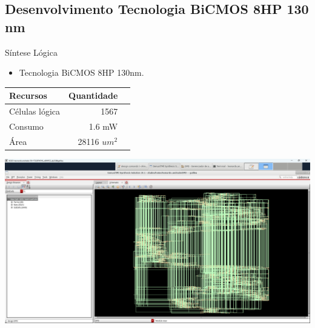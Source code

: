 \documentclass{if-beamer}
\begin{document}
\subsection{Desenvolvimento Tecnologia BiCMOS 8HP 130 nm}
\begin{frame}{Síntese Lógica}
		\begin{minipage}{0.5\textwidth}
		\begin{itemize}
			\item Tecnologia BiCMOS 8HP 130nm.
		\end{itemize}
		\begin{tabular}{|l|r|r|}
			\hline
			Recursos & Quantidade  \\
			\hline
			Células lógica & 1567  \\
			Consumo & 1.6 mW  \\
			Área & 28116 $um^2$  \\
			\hline
		\end{tabular}
		
	\end{minipage}%
	\hspace{0.04\textwidth}
	\begin{minipage}{0.5\textwidth}
		\includegraphics[scale=0.10]{Sintesi-lógica.png}
	\end{minipage}
\end{frame}
\end{document}
